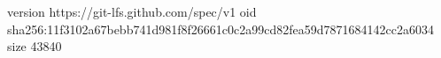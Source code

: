 version https://git-lfs.github.com/spec/v1
oid sha256:11f3102a67bebb741d981f8f26661c0c2a99cd82fea59d7871684142cc2a6034
size 43840
